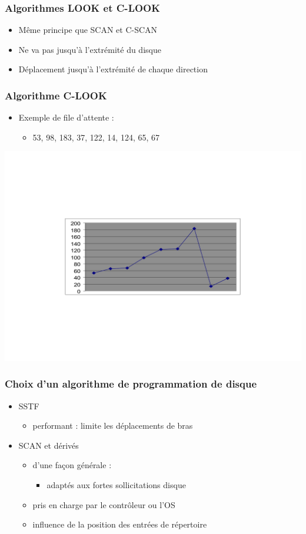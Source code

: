 \begin{frame}
\frametitle{Algorithmes LOOK et C-LOOK}
\begin{itemize}
\item Même principe que SCAN et C-SCAN
\item Ne va pas jusqu'à l'extrémité du disque
\item Déplacement jusqu'à l'extrémité de chaque direction
\end{itemize}
\end{frame}

\begin{frame}
\frametitle{Algorithme C-LOOK}
\begin{itemize}
\item Exemple de file d'attente :
\begin{itemize}
\item 53, 98, 183, 37, 122, 14, 124, 65, 67
\end{itemize}
\end{itemize}
\includegraphics[width=.8\textwidth]{../illustration/prog_disque_clook.pdf}
\end{frame}

\begin{frame}
\frametitle{Choix d’un algorithme de programmation de disque}
\begin{itemize}
\item SSTF
\begin{itemize}
\item performant : limite les déplacements de bras
\end{itemize}
\item SCAN et dérivés
\begin{itemize}
\item d'une façon générale :
\begin{itemize}
\item adaptés aux fortes sollicitations disque
\end{itemize}
\item pris en charge par le contrôleur ou l'OS
\item influence de la position des entrées de répertoire
\end{itemize}
\end{itemize}
\end{frame}


